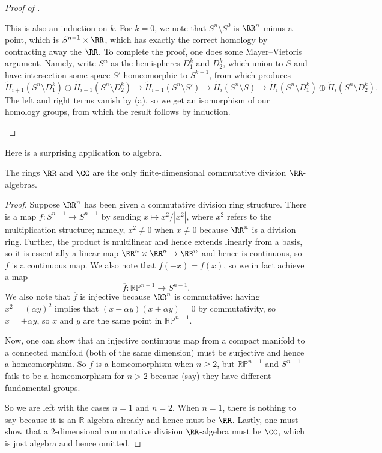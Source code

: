 \documentclass[../notes.tex]{subfiles}
\begin{document}
\begin{proof}[Proof of ]
\begin{listalph}
		\item This is also an induction on $k$. For $k=0$, we note that $S^n\setminus S^0$ is $\RR^n$ minus a point, which is $S^{n-1}\times\RR$, which has exactly the correct homology by contracting away the $\RR$. To complete the proof, one does some Mayer--Vietoris argument. Namely, write $S^n$ as the hemispheres $D_1^k$ and $D_2^k$, which union to $S$ and have intersection some space $S'$ homeomorphic to $S^{k-1}$, from which  produces
		\[\widetilde H_{i+1}\left(S^n\setminus D_1^k\right)\oplus\widetilde H_{i+1}\left(S^n\setminus D_2^k\right)\to \widetilde H_{i+1}\left(S^n\setminus S'\right)\to\widetilde H_{i}\left(S^n\setminus S\right)\to \widetilde H_{i}\left(S^n\setminus D_1^k\right)\oplus\widetilde H_i\left(S^n\setminus D_2^k\right).\]
		The left and right terms vanish by (a), so we get an isomorphism of our homology groups, from which the result follows by induction.
		\qedhere
	\end{listalph}
\end{proof}
Here is a surprising application to algebra.
\begin{theorem}
	The rings $\RR$ and $\CC$ are the only finite-dimensional commutative division $\RR$-algebras.
\end{theorem}
\begin{proof}
	Suppose $\RR^n$ has been given a commutative division ring structure. There is a map $f\colon S^{n-1}\to S^{n-1}$ by sending $x\mapsto x^2/\left|x^2\right|$, where $x^2$ refers to the multiplication structure; namely, $x^2\ne0$ when $x\ne0$ because $\RR^n$ is a division ring. Further, the product is multilinear and hence extends linearly from a basis, so it is essentially a linear map $\RR^n\times\RR^n\to\RR^n$ and hence is continuous, so $f$ is a continuous map. We also note that $f(-x)=f(x)$, so we in fact achieve a map
	\[\overline f\colon\mathbb{RP}^{n-1}\to S^{n-1}.\]
	We also note that $\overline f$ is injective because $\RR^n$ is commutative: having $x^2=(\alpha y)^2$ implies that $(x-\alpha y)(x+\alpha y)=0$ by commutativity, so $x=\pm\alpha y$, so $x$ and $y$ are the same point in $\mathbb{RP}^{n-1}$.

	Now, one can show that an injective continuous map from a compact manifold to a connected manifold (both of the same dimension) must be surjective and hence a homeomorphism. So $\overline f$ is a homeomorphism when $n\ge2$, but $\mathbb{RP}^{n-1}$ and $S^{n-1}$ fails to be a homeomorphism for $n>2$ because (say) they have different fundamental groups.

	So we are left with the cases $n=1$ and $n=2$. When $n=1$, there is nothing to say because it is an $\mathbb R$-algebra already and hence must be $\RR$. Lastly, one must show that a $2$-dimensional commutative division $\RR$-algebra must be $\CC$, which is just algebra and hence omitted.
\end{proof}
\end{document}
